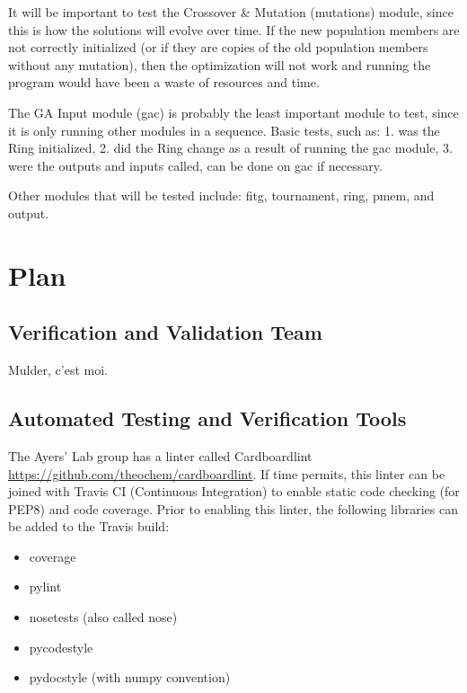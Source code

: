 \documentclass[12pt, titlepage]{article}
\begin{document}
It will be important to test the Crossover \& Mutation (mutations) module, 
since this is how the solutions will evolve over time. If the new population 
members are not correctly initialized (or if they are copies of the old 
population members without any mutation), then the optimization will not work 
and running the program would have been a waste of resources and time.

The GA Input module (gac) is probably the least important module to test, since 
it is only running other modules in a sequence. Basic tests, such as: 1. was 
the Ring initialized, 2. did the Ring change as a result of running the gac 
module, 3. were the outputs and inputs called, can be done on gac if necessary.

Other modules that will be tested include: fitg, tournament, ring, pmem, and 
output.


\section{Plan}
	
\subsection{Verification and Validation Team}

Mulder, c'est moi.

\subsection{Automated Testing and Verification Tools} \label{test-tools}

The Ayers' Lab group has a linter called Cardboardlint 
\url{https://github.com/theochem/cardboardlint}. If time permits, this linter 
can be joined with Travis CI (Continuous Integration) to enable static code 
checking (for PEP8) and code coverage. Prior to enabling this linter, the 
following libraries can be added to the Travis build:

\begin{itemize}
	\item coverage
	\item pylint
	\item nosetests (also called nose)
	\item pycodestyle
	\item pydocstyle (with numpy convention)
\end{itemize}
\end{document}

